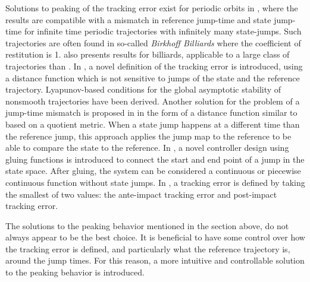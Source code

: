 \documentclass[../DC2017114Bouma.tex]{subfiles}
\begin{document}
Solutions to peaking of the tracking error exist for periodic orbits in \cite{Menini2001,Galeani2008}, where the results are compatible with a mismatch in reference jump-time and state jump-time for infinite time periodic trajectories with infinitely many state-jumps. Such trajectories are often found in so-called \textit{Birkhoff Billiards} where the coefficient of restitution is 1. \cite{Forni2013} also presents results for billiards, applicable to a large class of trajectories than \cite{Menini2001,Galeani2008}. In \cite{Biemond2013,Biemond2016}, a novel definition of the tracking error is introduced, using a distance function which is not sensitive to jumps of the state and the reference trajectory. Lyapunov-based conditions for the global asymptotic stability of nonsmooth trajectories have been derived. Another solution for the problem of a jump-time mismatch is proposed in \cite{Baumann2018} in the form of a distance function similar to \cite{Biemond2013,Biemond2016} based on a quotient metric. When a state jump happens at a different time than the reference jump, this approach applies the jump map to the reference to be able to compare the state to the reference. In \cite{Kim2016}, a novel controller design using gluing functions is introduced to connect the start and end point of a jump in the state space. After gluing, the system can be considered a continuous or piecewise continuous function without state jumps. In \cite{Yang2017}, a tracking error is defined by taking the smallest of two values: the ante-impact tracking error and post-impact tracking error.

The solutions to the peaking behavior mentioned in the section above, do not always appear to be the best choice. It is beneficial to have some control over how the tracking error is defined, and particularly what the reference trajectory is, around the jump times. For this reason, a more intuitive and controllable solution to the peaking behavior is introduced.
\end{document}

